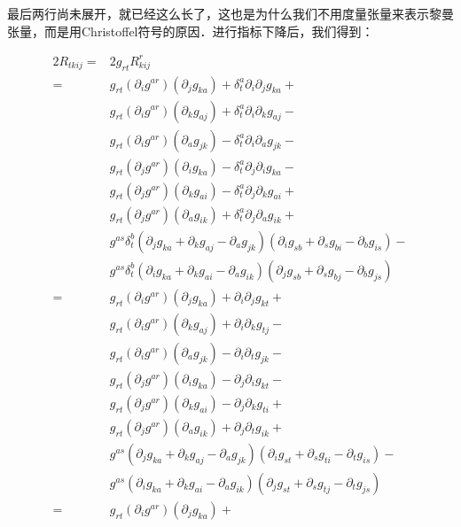最后两行尚未展开，就已经这么长了，这也是为什么我们不用度量张量来表示黎曼张量，而是用Christoffel符号的原因．进行指标下降后，我们得到：

\begin{equation}\label{RicciC_eq2}
\begin{aligned}
2R_{tkij}=&2g_{rt}R^r_{kij}\\
=&g_{rt}(\partial_ig^{ar})(\partial_jg_{ka})+\delta^a_t\partial_i\partial_jg_{ka}+\\
&g_{rt}(\partial_ig^{ar})(\partial_kg_{aj})+\delta^a_t\partial_i\partial_kg_{aj}-\\
&g_{rt}(\partial_ig^{ar})(\partial_ag_{jk})-\delta^a_t\partial_i\partial_ag_{jk}-\\%
&g_{rt}(\partial_jg^{ar})(\partial_ig_{ka})-\delta^a_t\partial_j\partial_ig_{ka}-\\
&g_{rt}(\partial_jg^{ar})(\partial_kg_{ai})-\delta^a_t\partial_j\partial_kg_{ai}+\\
&g_{rt}(\partial_jg^{ar})(\partial_ag_{ik})+\delta^a_t\partial_j\partial_ag_{ik}+\\%
&g^{as}\delta^b_t(\partial_jg_{ka}+\partial_kg_{aj}-\partial_ag_{jk})(\partial_ig_{sb}+\partial_sg_{bi}-\partial_bg_{is})-\\
&g^{as}\delta^b_t(\partial_ig_{ka}+\partial_kg_{ai}-\partial_ag_{ik})(\partial_jg_{sb}+\partial_sg_{bj}-\partial_bg_{js})\\
=&g_{rt}(\partial_ig^{ar})(\partial_jg_{ka})+\partial_i\partial_jg_{kt}+\\
&g_{rt}(\partial_ig^{ar})(\partial_kg_{aj})+\partial_i\partial_kg_{tj}-\\
&g_{rt}(\partial_ig^{ar})(\partial_ag_{jk})-\partial_i\partial_tg_{jk}-\\%
&g_{rt}(\partial_jg^{ar})(\partial_ig_{ka})-\partial_j\partial_ig_{kt}-\\
&g_{rt}(\partial_jg^{ar})(\partial_kg_{ai})-\partial_j\partial_kg_{ti}+\\
&g_{rt}(\partial_jg^{ar})(\partial_ag_{ik})+\partial_j\partial_tg_{ik}+\\%
&g^{as}(\partial_jg_{ka}+\partial_kg_{aj}-\partial_ag_{jk})(\partial_ig_{st}+\partial_sg_{ti}-\partial_tg_{is})-\\
&g^{as}(\partial_ig_{ka}+\partial_kg_{ai}-\partial_ag_{ik})(\partial_jg_{st}+\partial_sg_{tj}-\partial_tg_{js})\\
=&g_{rt}(\partial_ig^{ar})(\partial_jg_{ka})+\\

\end{aligned}
\end{equation}
